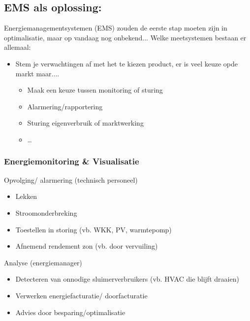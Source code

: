 \documentclass[12pt]{article}
\begin{document}
\subsection{EMS als oplossing:}
Energiemanagementsystemen (EMS) zouden de eerste stap moeten zijn in optimalisatie, maar op vandaag nog onbekend... \bigbreak
Welke meetsystemen bestaan er allemaal:\begin{itemize}
    \item Stem je verwachtingen af met het te kiezen product, er is veel keuze opde markt maar....\begin{itemize}
        \item Maak een keuze tussen monitoring of sturing 
        \item Alarmering/rapportering 
        \item Sturing eigenverbruik of marktwerking 
        \item \dots
    \end{itemize}
\end{itemize}
\subsubsection{Energiemonitoring \& Visualisatie}
Opvolging/ alarmering (technisch personeel)\begin{itemize}
    \item Lekken 
    \item Stroomonderbreking 
    \item Toestellen in storing (vb. WKK, PV, warmtepomp)
    \item Afnemend rendement zon (vb. door vervuiling)
\end{itemize}
Analyse (energiemanager)\begin{itemize}
    \item Detecteren van onnodige sluimerverbruikers (vb. HVAC die blijft draaien)
    \item Verwerken energiefacturatie/ doorfacturatie 
    \item Advies door besparing/optimalisatie
\end{itemize}
\end{document}
